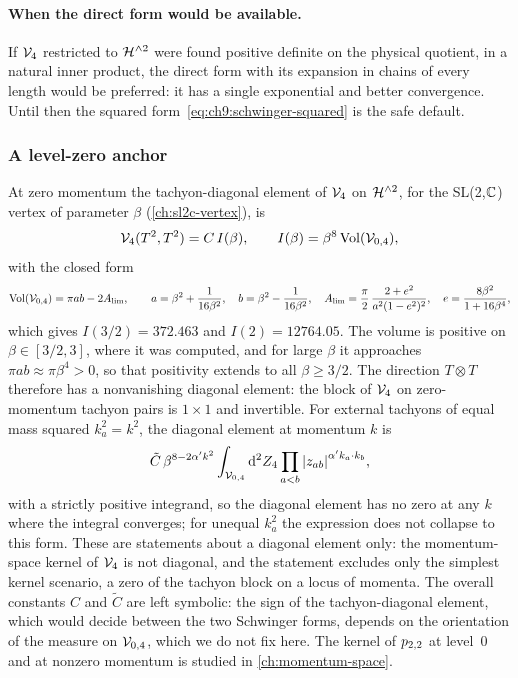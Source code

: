 \paragraph{When the direct form would be available.}
If $\mathcal{V}_{4}$ restricted to $\mathcal{H}^{\wedge 2}$ were found positive definite on the physical quotient, in a natural inner product, the direct form with its expansion in chains of every length would be preferred: it has a single exponential and better convergence.
Until then the squared form~\eqref{eq:ch9:schwinger-squared} is the safe default.

\subsubsection{A level-zero anchor}
\label{sec:ws1:anchor}

At zero momentum the tachyon-diagonal element of $\mathcal{V}_{4}$ on $\mathcal{H}^{\wedge 2}$, for the SL(2,$\mathbb{C}$) vertex of parameter $\beta$ (\cref{ch:sl2c-vertex}), is
\begin{equation}
  \label{eq:ch9:anchor}
  \mathcal{V}_{4}(T^2, T^2)
    = C \, I(\beta),
  \qquad
  I(\beta)
    = \beta^8 \, \mathrm{Vol}({\mathcal{V}}_{0, 4}),
\end{equation}
with the closed form
\begin{equation}
  \label{eq:ch9:anchor-volume}
  \mathrm{Vol}({\mathcal{V}}_{0, 4})
    = \pi a b - 2 A_{\rm lim},
  \qquad
  a
    = \beta^2 + \frac{1}{16 \beta^2},
  \quad
  b
    = \beta^2 - \frac{1}{16 \beta^2},
  \quad
  A_{\rm lim}
    = \frac{\pi}{2} \, \frac{2 + e^2}{a^2 (1 - e^2)^2},
  \quad
  e
    = \frac{8 \beta^2}{1 + 16 \beta^4},
\end{equation}
which gives $I(3/2) = 372.463$ and $I(2) = 12764.05$.
The volume is positive on $\beta \in [3/2, 3]$, where it was computed, and for large $\beta$ it approaches $\pi a b \approx \pi \beta^4 > 0$, so that positivity extends to all $\beta \ge 3/2$.
The direction $T \otimes T$ therefore has a nonvanishing diagonal element: the block of $\mathcal{V}_{4}$ on zero-momentum tachyon pairs is $1 \times 1$ and invertible.
For external tachyons of equal mass squared $k_a^2 = k^2$, the diagonal element at momentum $k$ is
\begin{equation}
  \label{eq:ch9:anchor-momentum}
  \tilde C \, \beta^{8 - 2 \alpha' k^2} \int_{{\mathcal{V}}_{0, 4}} \mathrm{d}^2 Z_4 \prod_{a < b} {|z_{ab}|}^{\alpha' k_a \cdot k_b},
\end{equation}
with a strictly positive integrand, so the diagonal element has no zero at any $k$ where the integral converges; for unequal $k_a^2$ the expression does not collapse to this form.
These are statements about a diagonal element only: the momentum-space kernel of $\mathcal{V}_{4}$ is not diagonal, and the statement excludes only the simplest kernel scenario, a zero of the tachyon block on a locus of momenta.
The overall constants $C$ and $\tilde C$ are left symbolic: the sign of the tachyon-diagonal element, which would decide between the two Schwinger forms, depends on the orientation of the measure on ${\mathcal{V}}_{0, 4}$, which we do not fix here.
The kernel of $p_{2,2}$ at level~$0$ and at nonzero momentum is studied in \cref{ch:momentum-space}.

